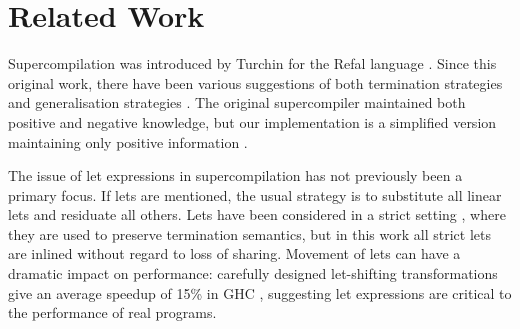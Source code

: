\section{Related Work}
\label{sec:related}

Supercompilation \cite{supercompilation,turchin:experiments} was introduced by Turchin for the Refal language \cite{refal}. Since this original work, there have been various suggestions of both termination strategies and generalisation strategies \cite{turchin:generalisation,sorensen:supercompilation,leuschel:homeomorphic}. The original supercompiler maintained both positive and negative knowledge, but our implementation is a simplified version maintaining only positive information \cite{secher:perfect_supercompilation}.

The issue of let expressions in supercompilation has not previously been a primary focus. If lets are mentioned, the usual strategy is to substitute all linear lets and residuate all others. Lets have been considered in a strict setting \cite{jonsson:supercompilation}, where they are used to preserve termination semantics, but in this work all strict lets are inlined without regard to loss of sharing. Movement of lets can have a dramatic impact on performance: carefully designed let-shifting transformations give an average speedup of 15\% in GHC \cite{spj:letfloating}, suggesting let expressions are critical to the performance of real programs.

